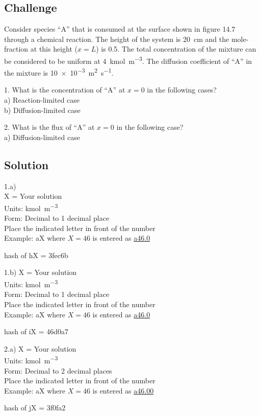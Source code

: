 \subsection*{Challenge}
Consider species ``A'' that is consumed at the surface shown in figure 14.7 through a chemical reaction. The height of the system is \SI{20}{\cm} and the mole-fraction at this height ($x=L$) is \num{0.5}. The total concentration of the mixture can be considered to be uniform at \SI{4}{\kmol\per\cubic\meter}. The diffusion coefficient of ``A'' in the mixture is \SI{10e-3}{\square\meter\per\second}.

1. What is the concentration of ``A'' at $x=0$ in the following cases?\\
a) Reaction-limited case\\
b) Diffusion-limited case

2. What is the flux of ``A'' at $x=0$ in the following case?\\
a) Diffusion-limited case

\subsection*{Solution}
1.a)\\
X = Your solution\\
Units: \si{\kmol\per\cubic\meter}\\
Form: Decimal to 1 decimal place\\
Place the indicated letter in front of the number\\
Example: aX where $X=46$ is entered as \href{http://www.wolframalpha.com/input/?i=md5+hash+of+\%22a46.0\%22}{a46.0}

hash of hX = 3fec6b

1.b)
X = Your solution\\
Units: \si{\kmol\per\cubic\meter}\\
Form: Decimal to 1 decimal place\\
Place the indicated letter in front of the number\\
Example: aX where $X=46$ is entered as \href{http://www.wolframalpha.com/input/?i=md5+hash+of+\%22a46.0\%22}{a46.0}

hash of iX = 46d0a7

2.a)
X = Your solution\\
Units: \si{\kmol\per\cubic\meter}\\
Form: Decimal to 2 decimal places\\
Place the indicated letter in front of the number\\
Example: aX where $X=46$ is entered as \href{http://www.wolframalpha.com/input/?i=md5+hash+of+\%22a46.00\%22}{a46.00}

hash of jX = 3f0fa2
\fi
